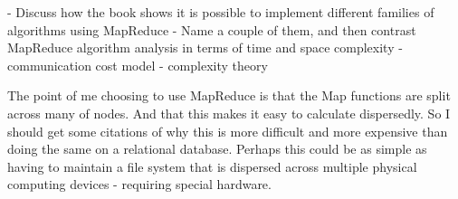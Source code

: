 - Discuss how the book shows it is possible to implement different families of algorithms using MapReduce
- Name a couple of them, and then contrast MapReduce algorithm analysis in terms of time and space complexity
- communication cost model
- complexity theory

The point of me choosing to use MapReduce is that the Map functions are split across many of nodes. And that this makes it easy to calculate dispersedly. So I should get some citations of why this is more difficult and more expensive than doing the same on a relational database. Perhaps this could be as simple as having to maintain a file system that is dispersed across multiple physical computing devices - requiring special hardware.